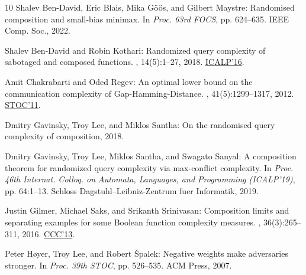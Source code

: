 \documentclass[11pt]{article}
\numberwithin{equation}{section}
\theoremstyle{definition}
\theoremstyle{plain}
\begin{document}
\begin{thebibliography}{10}
{\sc Shalev Ben-David, Eric Blais, Mika G{\"o}{\"o}s, and Gilbert Maystre}:
  Randomised composition and small-bias minimax.
\newblock In {\em Proc. 63rd FOCS}, pp. 624--635. IEEE Comp. Soc., 2022.

{\sc Shalev Ben{-}David and Robin Kothari}: Randomized query complexity of
  sabotaged and composed functions.
, 14(5):1--27, 2018.
\newblock \prelim
  \href{https://doi.org/10.4230/LIPIcs.ICALP.2016.60}{ICALP'16}.

{\sc Amit Chakrabarti and Oded Regev}: An optimal lower bound on the
  communication complexity of {Gap-Hamming-Distance}.
, 41(5):1299--1317, 2012.
\newblock \prelim \href{https://doi.org/10.1145/1993636.1993644}{STOC'11}.

{\sc Dmitry Gavinsky, Troy Lee, and Miklos Santha}: On the randomised query
  complexity of composition, 2018.

{\sc Dmitry Gavinsky, Troy Lee, Miklos Santha, and Swagato Sanyal}: A
  composition theorem for randomized query complexity via max-conflict
  complexity.
\newblock In {\em Proc. 46th Internat. Colloq. on Automata, Languages, and
  Programming (ICALP'19)}, pp. 64:1--13. Schloss Dagstuhl--Leibniz-Zentrum fuer
  Informatik, 2019.

{\sc Justin Gilmer, Michael Saks, and Srikanth Srinivasan}: Composition limits
  and separating examples for some {B}oolean function complexity measures.
, 36(3):265--311, 2016.
\newblock \prelim \href{https://doi.org/10.1109/CCC.2013.27}{CCC'13}.

{\sc Peter H{\o}yer, Troy Lee, and Robert {\v S}palek}: Negative weights make
  adversaries stronger.
\newblock In {\em Proc. 39th STOC}, pp. 526--535. ACM Press, 2007.


\end{thebibliography}
\end{document}
